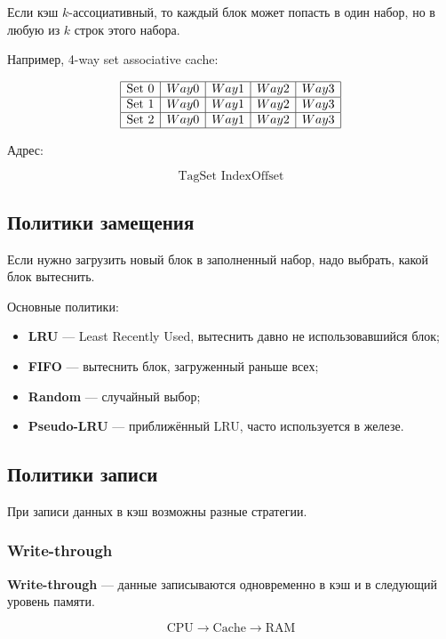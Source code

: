 \documentclass[12pt,a4paper]{article}
\theoremstyle{remark}
\begin{document}
Если кэш $k$-ассоциативный, то каждый блок может попасть в один набор, но в любую из $k$ строк этого набора.

Например, 4-way set associative cache:

\[
\begin{array}{|c|c|c|c|c|}
\hline
\text{Set 0} & Way 0 & Way 1 & Way 2 & Way 3 \\
\hline
\text{Set 1} & Way 0 & Way 1 & Way 2 & Way 3 \\
\hline
\text{Set 2} & Way 0 & Way 1 & Way 2 & Way 3 \\
\hline
\end{array}
\]

Адрес:

\[
\boxed{\text{Tag}}
\boxed{\text{Set Index}}
\boxed{\text{Offset}}
\]

\subsection{Политики замещения}

Если нужно загрузить новый блок в заполненный набор, надо выбрать, какой блок вытеснить.

Основные политики:
\begin{itemize}
    \item \textbf{LRU} --- Least Recently Used, вытеснить давно не использовавшийся блок;
    \item \textbf{FIFO} --- вытеснить блок, загруженный раньше всех;
    \item \textbf{Random} --- случайный выбор;
    \item \textbf{Pseudo-LRU} --- приближённый LRU, часто используется в железе.
\end{itemize}

\subsection{Политики записи}

При записи данных в кэш возможны разные стратегии.

\subsubsection{Write-through}

\textbf{Write-through} --- данные записываются одновременно в кэш и в следующий уровень памяти.

\[
\boxed{\text{CPU}}
\rightarrow
\boxed{\text{Cache}}
\rightarrow
\boxed{\text{RAM}}
\]
\end{document}
